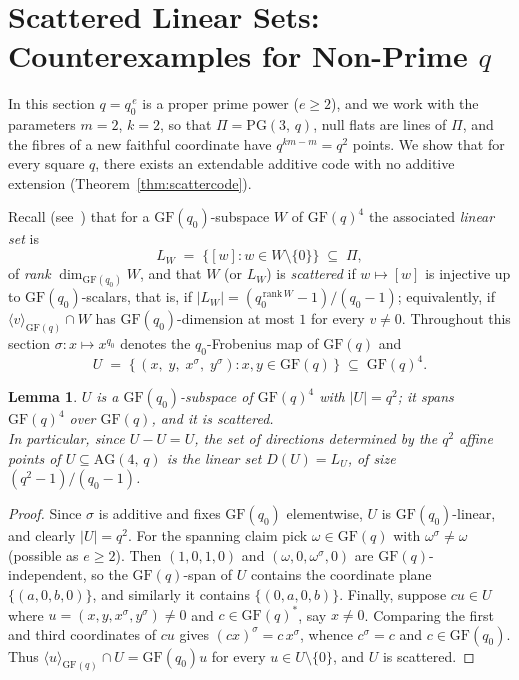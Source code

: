 \documentclass[12pt]{article}
\newtheorem{lem}[thm]{Lemma}
\theoremstyle{definition}
\numberwithin{equation}{section}
\newcommand{\GF}[1]{\mathrm{GF}(#1)}
\newcommand{\PG}[2]{\mathrm{PG}(#1,\,#2)}
\newcommand{\AG}[2]{\mathrm{AG}(#1,\,#2)}
\begin{document}
\section{Scattered Linear Sets:\\ Counterexamples for Non-Prime $q$}
\label{sec:scatter}

In this section $q=q_0^{\,e}$ is a proper prime power ($e\geq2$), and we work with the parameters $m=2$, $k=2$, so that $\Pi=\PG{3}{q}$, null flats are lines of $\Pi$, and the fibres of a new faithful coordinate have $q^{km-m}=q^2$ points.  We show that for every square $q$, there exists an extendable additive code with no additive extension (Theorem~\ref{thm:scattercode}).

Recall (see~\cite{MR1772204,MR2684078}) that for a $\GF{q_0}$-subspace $W$ of $\GF{q}^{4}$ the associated \textit{linear set} is
\[
  L_W\;=\;\bigl\{[w] : w\in W\setminus\{0\}\bigr\}\;\subseteq\;\Pi ,
\]
of \textit{rank} $\dim_{\GF{q_0}}W$, and that $W$ (or $L_W$) is \textit{scattered} if $w\mapsto[w]$ is injective up to $\GF{q_0}$-scalars, that is, if $|L_W|=(q_0^{\,\mathrm{rank}\,W}-1)/(q_0-1)$; equivalently, if $\langle v\rangle_{\GF{q}}\cap W$ has $\GF{q_0}$-dimension at most $1$ for every $v\neq0$.  Throughout this section $\sigma:x\mapsto x^{q_0}$ denotes the $q_0$-Frobenius map of $\GF{q}$ and
\begin{equation}\label{eq:defU}
  U \;=\; \bigl\{\,(x,\;y,\;x^{\sigma},\;y^{\sigma}) :  x,y\in\GF{q}\,\bigr\}\;\subseteq\;\GF{q}^{4}.
\end{equation}

\begin{lem}\label{lem:scattered}
$U$ is a $\GF{q_0}$-subspace of $\GF{q}^4$ with $|U|=q^2$; it spans $\GF{q}^4$ over $\GF{q}$, and it is scattered. \\ In particular, since $U-U=U$, the set of directions determined by the $q^2$ affine points of $U\subseteq\AG{4}{q}$ is the linear set $D(U)=L_U$, of size $(q^{2}-1)/(q_0-1)$.
\end{lem}

\begin{proof}
Since $\sigma$ is additive and fixes $\GF{q_0}$ elementwise, $U$ is $\GF{q_0}$-linear, and clearly $|U|=q^2$.  For the spanning claim pick $\omega\in\GF{q}$ with $\omega^{\sigma}\neq\omega$ (possible as $e\geq2$). Then $(1,0,1,0)$ and $(\omega,0,\omega^{\sigma},0)$ are $\GF{q}$-independent, so the $\GF{q}$-span of $U$ contains the coordinate plane $\{(a,0,b,0)\}$, and similarly it contains $\{(0,a,0,b)\}$.  Finally, suppose $cu\in U$ where $u=(x,y,x^{\sigma},y^{\sigma})\neq0$ and $c\in\GF{q}^{*}$, say $x\neq0$.  Comparing the first and third coordinates of $cu$ gives $(cx)^{\sigma}=c\,x^{\sigma}$, whence $c^{\sigma}=c$ and $c\in\GF{q_0}$.  Thus $\langle u\rangle_{\GF q}\cap U=\GF{q_0}u$ for every $u\in U\setminus\{0\}$, and $U$ is scattered.
\end{proof}
\end{document}
